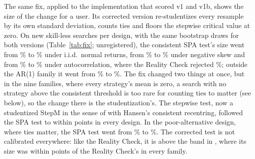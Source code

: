 The same fix, applied to the implementation that scored v1 and v1b, shows the size of the change for a user. Its corrected version \citep{canlicapital562} re-studentizes every resample by its own standard deviation, counts ties and floors the stepwise critical value at zero. On  new skill-less searches per design, with the same bootstrap draws for both versions (Table~\ref{tab:fix}; unregistered), the consistent SPA test's size went from \% to \% under i.i.d.\ normal returns, from \% to \% under negative skew and from \% to \% under autocorrelation, where the Reality Check rejected \%; outside the AR(1) family it went from \% to \%. The fix changed two things at once, but in the nine families, where every strategy's mean is zero, a search with no strategy above the consistent threshold is too rare for counting ties to matter (see below), so the change there is the studentization's. The stepwise test, now a studentized StepM in the sense of \citet{romano2005stepwise} with Hansen's consistent recentring, followed the SPA test to within  points in every design. In the poor-alternative design, where ties matter, the SPA test went from \% to \%. The corrected test is not calibrated everywhere: like the Reality Check, it is above the band in , where its size was within  points of the Reality Check's in every family.

